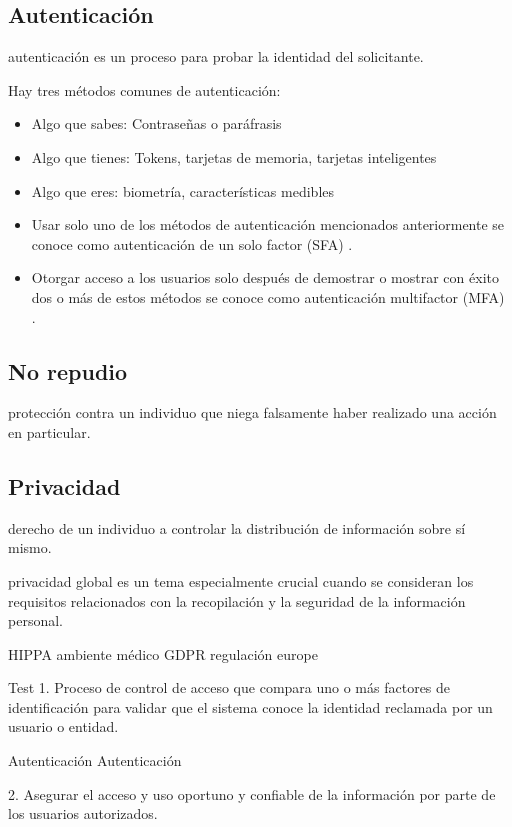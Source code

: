 \subsection{Autenticación}
autenticación es un proceso para probar la identidad del solicitante.

Hay tres métodos comunes de autenticación:
\begin{itemize}
 

   \item Algo que sabes: Contraseñas o paráfrasis
   \item Algo que tienes: Tokens, tarjetas de memoria, tarjetas inteligentes
   \item Algo que eres: biometría, características medibles
\end{itemize}
\begin{itemize}
   \item Usar solo uno de los métodos de autenticación mencionados anteriormente se conoce como autenticación de un solo factor (SFA) .
    \item Otorgar acceso a los usuarios solo después de demostrar o mostrar con éxito dos o más de estos métodos se conoce como autenticación multifactor (MFA) .
 \end{itemize}

 \subsection{No repudio}
  protección contra un individuo que niega falsamente haber realizado una acción en particular.
\subsection{Privacidad}
derecho de un individuo a controlar la distribución de información sobre sí mismo.

privacidad global es un tema especialmente crucial cuando se consideran los requisitos relacionados con la recopilación y la seguridad de la información personal.

HIPPA ambiente médico
GDPR regulación europe


Test
1. Proceso de control de acceso que compara uno o más factores de identificación para validar que el sistema conoce la identidad reclamada por un usuario o entidad.


Autenticación
   Autenticación

2. Asegurar el acceso y uso oportuno y confiable de la información por parte de los usuarios autorizados.


